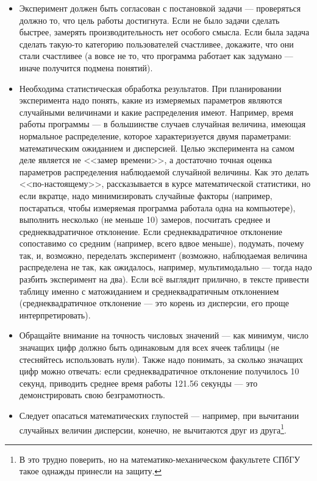 \documentclass{article}
\begin{document}
\begin{itemize}
    \item Эксперимент должен быть согласован с постановкой задачи --- проверяться должно то, что цель работы достигнута. Если не было задачи сделать быстрее, замерять производительность нет особого смысла. Если была задача сделать такую-то категорию пользователей счастливее, докажите, что они стали счастливее (а вовсе не то, что программа работает как задумано --- иначе получится подмена понятий).
    \item Необходима статистическая обработка результатов. При планировании эксперимента надо понять, какие из измеряемых параметров являются случайными величинами и какие распределения имеют. Например, время работы программы --- в большинстве случаев случайная величина, имеющая нормальное распределение, которое характеризуется двумя параметрами: математическим ожиданием и дисперсией. Целью эксперимента на самом деле является не <<замер времени>>, а достаточно точная оценка параметров распределения наблюдаемой случайной величины. Как это делать <<по-настоящему>>, рассказывается в курсе математической статистики, но если вкратце, надо минимизировать случайные факторы (например, постараться, чтобы измеряемая программа работала одна на компьютере), выполнить несколько (не меньше 10) замеров, посчитать среднее и среднеквадратичное отклонение. Если среднеквадратичное отклонение сопоставимо со средним (например, всего вдвое меньше), подумать, почему так, и, возможно, переделать эксперимент (возможно, наблюдаемая величина распределена не так, как ожидалось, например, мультимодально --- тогда надо разбить эксперимент на два). Если всё выглядит прилично, в тексте привести таблицу именно с матожиданием и среднеквадратичным отклонением (среднеквадратичное отклонение --- это корень из дисперсии, его проще интерпретировать).
    \item Обращайте внимание на точность числовых значений --- как минимум, число значащих цифр должно быть одинаковым для всех ячеек таблицы (не стесняйтесь использовать нули). Также надо понимать, за сколько значащих цифр можно отвечать: если среднеквадратичное отклонение получилось 10 секунд, приводить среднее время работы 121.56 секунды --- это демонстрировать свою безграмотность.
    \item Следует опасаться математических глупостей --- например, при вычитании случайных величин дисперсии, конечно, не вычитаются друг из друга\footnote{В это трудно поверить, но на математико-механическом факультете СПбГУ такое однажды принесли на защиту.}.

\end{itemize}
\end{document}
